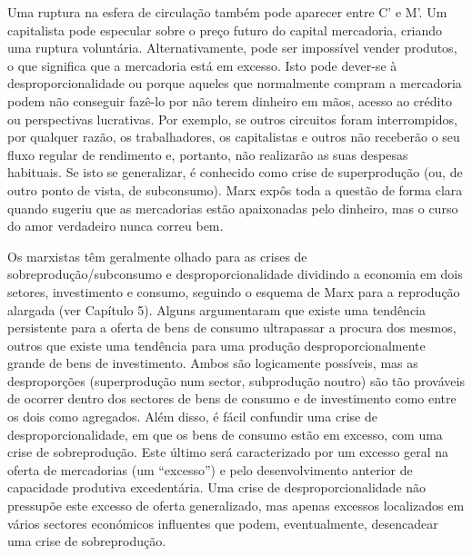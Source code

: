 \par 
Uma ruptura na esfera de circulação também pode aparecer entre C' e M'. Um capitalista pode especular sobre o preço futuro do capital mercadoria, criando uma ruptura voluntária. Alternativamente, pode ser impossível vender produtos, o que significa que a mercadoria está em excesso. Isto pode dever-se à desproporcionalidade ou porque aqueles que normalmente compram a mercadoria podem não conseguir fazê-lo por não terem dinheiro em mãos, acesso ao crédito ou perspectivas lucrativas. Por exemplo, se outros circuitos foram interrompidos, por qualquer razão, os trabalhadores, os capitalistas e outros não receberão o seu fluxo regular de rendimento e, portanto, não realizarão as suas despesas habituais. Se isto se generalizar, é conhecido como crise de superprodução (ou, de outro ponto de vista, de subconsumo). Marx expôs toda a questão de forma clara quando sugeriu que as mercadorias estão apaixonadas pelo dinheiro, mas o curso do amor verdadeiro nunca correu bem.
 \par 
Os marxistas têm geralmente olhado para as crises de sobreprodução/subconsumo e desproporcionalidade dividindo a economia em dois setores, investimento e consumo, seguindo o esquema de Marx para a reprodução alargada (ver Capítulo {\color{blue}5}). Alguns argumentaram que existe uma tendência persistente para a oferta de bens de consumo ultrapassar a procura dos mesmos, outros que existe uma tendência para uma produção desproporcionalmente grande de bens de investimento. Ambos são logicamente possíveis, mas as desproporções (superprodução num sector, subprodução noutro) são tão prováveis ​​de ocorrer dentro dos sectores de bens de consumo e de investimento como entre os dois como agregados. Além disso, é fácil confundir uma crise de desproporcionalidade, em que os bens de consumo estão em excesso, com uma crise de sobreprodução. Este último será caracterizado por um excesso geral na oferta de mercadorias (um “excesso”) e pelo desenvolvimento anterior de capacidade produtiva excedentária. Uma crise de desproporcionalidade não pressupõe este excesso de oferta generalizado, mas apenas excessos localizados em vários sectores económicos influentes que podem, eventualmente, desencadear uma crise de sobreprodução.
 \par 
